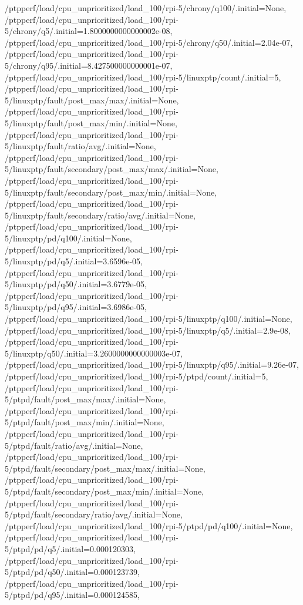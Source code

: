 {    /ptpperf/load/cpu_unprioritized/load_100/rpi-5/chrony/q100/.initial=None,
    /ptpperf/load/cpu_unprioritized/load_100/rpi-5/chrony/q5/.initial=1.8000000000000002e-08,
    /ptpperf/load/cpu_unprioritized/load_100/rpi-5/chrony/q50/.initial=2.04e-07,
    /ptpperf/load/cpu_unprioritized/load_100/rpi-5/chrony/q95/.initial=8.427500000000001e-07,
    /ptpperf/load/cpu_unprioritized/load_100/rpi-5/linuxptp/count/.initial=5,
    /ptpperf/load/cpu_unprioritized/load_100/rpi-5/linuxptp/fault/post_max/max/.initial=None,
    /ptpperf/load/cpu_unprioritized/load_100/rpi-5/linuxptp/fault/post_max/min/.initial=None,
    /ptpperf/load/cpu_unprioritized/load_100/rpi-5/linuxptp/fault/ratio/avg/.initial=None,
    /ptpperf/load/cpu_unprioritized/load_100/rpi-5/linuxptp/fault/secondary/post_max/max/.initial=None,
    /ptpperf/load/cpu_unprioritized/load_100/rpi-5/linuxptp/fault/secondary/post_max/min/.initial=None,
    /ptpperf/load/cpu_unprioritized/load_100/rpi-5/linuxptp/fault/secondary/ratio/avg/.initial=None,
    /ptpperf/load/cpu_unprioritized/load_100/rpi-5/linuxptp/pd/q100/.initial=None,
    /ptpperf/load/cpu_unprioritized/load_100/rpi-5/linuxptp/pd/q5/.initial=3.6596e-05,
    /ptpperf/load/cpu_unprioritized/load_100/rpi-5/linuxptp/pd/q50/.initial=3.6779e-05,
    /ptpperf/load/cpu_unprioritized/load_100/rpi-5/linuxptp/pd/q95/.initial=3.6986e-05,
    /ptpperf/load/cpu_unprioritized/load_100/rpi-5/linuxptp/q100/.initial=None,
    /ptpperf/load/cpu_unprioritized/load_100/rpi-5/linuxptp/q5/.initial=2.9e-08,
    /ptpperf/load/cpu_unprioritized/load_100/rpi-5/linuxptp/q50/.initial=3.2600000000000003e-07,
    /ptpperf/load/cpu_unprioritized/load_100/rpi-5/linuxptp/q95/.initial=9.26e-07,
    /ptpperf/load/cpu_unprioritized/load_100/rpi-5/ptpd/count/.initial=5,
    /ptpperf/load/cpu_unprioritized/load_100/rpi-5/ptpd/fault/post_max/max/.initial=None,
    /ptpperf/load/cpu_unprioritized/load_100/rpi-5/ptpd/fault/post_max/min/.initial=None,
    /ptpperf/load/cpu_unprioritized/load_100/rpi-5/ptpd/fault/ratio/avg/.initial=None,
    /ptpperf/load/cpu_unprioritized/load_100/rpi-5/ptpd/fault/secondary/post_max/max/.initial=None,
    /ptpperf/load/cpu_unprioritized/load_100/rpi-5/ptpd/fault/secondary/post_max/min/.initial=None,
    /ptpperf/load/cpu_unprioritized/load_100/rpi-5/ptpd/fault/secondary/ratio/avg/.initial=None,
    /ptpperf/load/cpu_unprioritized/load_100/rpi-5/ptpd/pd/q100/.initial=None,
    /ptpperf/load/cpu_unprioritized/load_100/rpi-5/ptpd/pd/q5/.initial=0.000120303,
    /ptpperf/load/cpu_unprioritized/load_100/rpi-5/ptpd/pd/q50/.initial=0.000123739,
    /ptpperf/load/cpu_unprioritized/load_100/rpi-5/ptpd/pd/q95/.initial=0.000124585,
}
